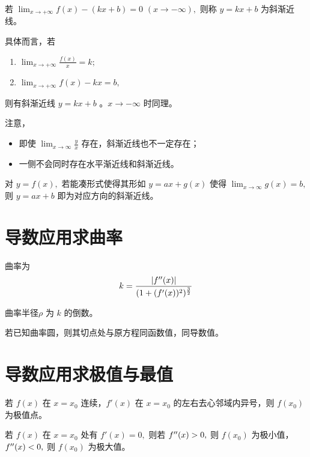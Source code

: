 
若 $ {\displaystyle\lim_{x\rightarrow +\infty}}f(x)-(kx+b)=0 $ $ (x\rightarrow-\infty), $ 则称
$ y=kx+b $ 为斜渐近线。

具体而言，若\begin{enumerate}
    \item $ {\displaystyle\lim_{x\rightarrow +\infty}}\frac{f(x)}{x}=k; $ 
    \item $ {\displaystyle\lim_{x\rightarrow +\infty}}f(x)-kx = b, $ 
\end{enumerate}
则有斜渐近线 $ y=kx+b $ 。$ x\rightarrow-\infty $ 时同理。

注意，
\begin{itemize}
    \item 即使 $ {\displaystyle\lim_{x\rightarrow \infty}} \frac{y}{x} $ 存在，斜渐近线也不一定存在；
    \item 一侧不会同时存在水平渐近线和斜渐近线。
\end{itemize}


对 $ y = f(x), $ 若能凑形式使得其形如 $ y = ax + g(x) $ 使得 $ {\displaystyle\lim_{x\rightarrow \infty}}g(x) = b, $ 
则 $ y = ax + b $ 即为对应方向的斜渐近线。

\section{导数应用求曲率}

曲率为$$
   k=\frac{|f^{\prime\prime}(x)|}{(1+(f'(x))^2)^{\frac{3}{2}}}
$$ 

曲率半径$ \rho $ 为 $ k $ 的倒数。

若已知曲率圆，则其切点处与原方程同函数值，同导数值。

\section{导数应用求极值与最值}


若 $ f(x) $ 在 $ x = x_0 $ 连续，$ f'(x) $ 在 $ x = x_0 $ 的左右去心邻域内异号，则 $ f(x_0) $ 为极值点。


若 $ f(x) $ 在 $ x = x_0 $ 处有 $ f'(x) = 0, $ 则若
$f^{\prime\prime}(x)> 0, $ 则 $ f(x_0) $ 为极小值，$f^{\prime\prime}(x)< 0, $ 则 $ f(x_0) $ 为极大值。


